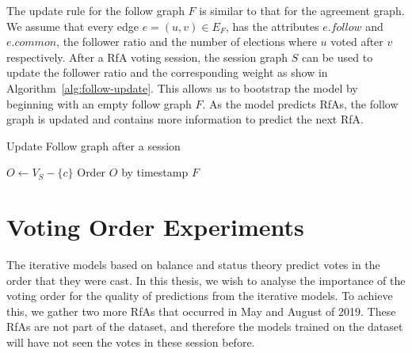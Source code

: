 The update rule for the follow graph $F$ is similar to that for the agreement graph.
We assume that every edge $e=(u,v) \in E_{F}$, has the attributes $e.follow$ and $e.common$, the follower ratio and the number of elections where $u$ voted after $v$ respectively.
After a RfA voting session, the session graph $S$ can be used to update the follower ratio and the corresponding weight as show in Algorithm~\ref{alg:follow-update}.
This allows us to bootstrap the model by beginning with an empty follow graph $F$.
As the model predicts RfAs, the follow graph is updated and contains more information to predict the next RfA.

\begin{algorithm}[htp]
    \DontPrintSemicolon
    \caption{Update Follow graph after a session}
    \label{alg:follow-update}
    $O \leftarrow V_{S}-\{c\}$\;
    Order $O$ by timestamp\;
    \Return $F$
\end{algorithm}

\section{Voting Order Experiments}
\label{sec:voting-order}
The iterative models based on balance and status theory predict votes in the order that they were cast.
In this thesis, we wish to analyse the importance of the voting order for the quality of predictions from the iterative models.
To achieve this, we gather two more RfAs that occurred in May and August of 2019.
These RfAs are not part of the \wikirfa dataset, and therefore the models trained on the dataset will have not seen the votes in these session before.

